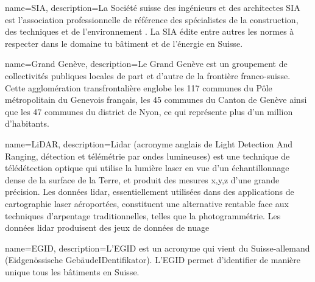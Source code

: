 {
    name=SIA,
    description={La Société suisse des ingénieurs et des architectes SIA est l’association professionnelle de référence des spécialistes de la construction, des techniques et de l’environnement \cite{sia_sia_nodate}. La SIA édite entre autres les normes à respecter dans le domaine tu bâtiment et de l'énergie en Suisse.}
}

{
    name=Grand Genève,
    description={Le Grand Genève est un groupement de collectivités publiques locales de part et d’autre de la frontière franco-suisse. Cette agglomération transfrontalière englobe les 117 communes du Pôle métropolitain du Genevois français, les 45 communes du Canton de Genève ainsi que les 47 communes du district de Nyon, ce qui représente plus d’un million d’habitants. \cite{noauthor_grand_nodate}}
}

{
    name=LiDAR,
    description={Lidar (acronyme anglais de Light Detection And Ranging, détection et télémétrie par ondes lumineuses) est une technique de télédétection optique qui utilise la lumière laser en vue d'un échantillonnage dense de la surface de la Terre, et produit des mesures x,y,z d'une grande précision. Les données lidar, essentiellement utilisées dans des applications de cartographie laser aéroportées, constituent une alternative rentable face aux techniques d’arpentage traditionnelles, telles que la photogrammétrie. Les données lidar produisent des jeux de données de nuage \cite{esri_quoi_2025}}
}

{
    name=EGID,
    description={L'EGID \cite{office_federal_de_la_statistique_egidewid_nodate} est un acronyme qui vient du Suisse-allemand (Eidgenössische GebäudeIDentifikator). L'EGID permet d'identifier de manière unique tous les bâtiments en Suisse.}
}




